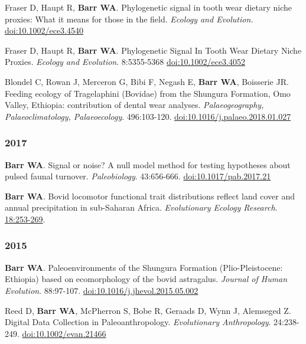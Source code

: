 \item Fraser D, Haupt R,  {\bfseries Barr WA}. Phylogenetic signal in tooth wear dietary niche proxies: What it means for those in the field. \emph{Ecology and Evolution.} \href{https://dx.doi.org/10.1002/ece3.4540}{doi:10.1002/ece3.4540}


\item  Fraser D, Haupt R,  {\bfseries Barr WA}. Phylogenetic Signal In Tooth Wear Dietary Niche Proxies. \emph{Ecology and Evolution}. 8:5355-5368 \href{https://doi.org/10.1002/ece3.4052}{doi:10.1002/ece3.4052}

\item  Blondel C, Rowan J, Merceron G, Bibi F,  Negash E, {\bfseries Barr WA}, Boisserie JR. Feeding ecology of Tragelaphini (Bovidae) from the Shungura Formation, Omo Valley, Ethiopia: contribution of dental wear analyses.  \emph{Palaeogeography, Palaeoclimatology, Palaeoecology}. 496:103-120. \href{https://doi.org/10.1016/j.palaeo.2018.01.027}{doi:10.1016/j.palaeo.2018.01.027}

\subsubsection*{2017}

\item  {\bfseries Barr WA}. Signal or noise? A null model method for testing hypotheses about pulsed faunal turnover. \emph{Paleobiology}. 43:656-666. \href{https://doi.org/10.1017/pab.2017.21}{doi:10.1017/pab.2017.21}

\item  {\bfseries Barr WA}. Bovid locomotor functional trait distributions reflect land cover and annual precipitation in sub-Saharan Africa. \emph{Evolutionary Ecology Research}.  \href{http://www.evolutionary-ecology.com/issues/v18/n03/ddar3051.pdf}{18:253-269}.

\subsubsection*{2015}

\item  {\bfseries Barr WA}. Paleoenvironments of the Shungura Formation (Plio-Pleistocene: Ethiopia) based on ecomorphology of the bovid astragalus. \emph{Journal of Human Evolution}. 88:97-107. \href{http://dx.doi.org/10.1016/j.jhevol.2015.05.002}{doi:10.1016/j.jhevol.2015.05.002}

\item  Reed D, {\bfseries Barr WA}, McPherron S, Bobe R, Geraads D, Wynn J, Alemseged Z. Digital Data Collection in Paleoanthropology. \emph{Evolutionary Anthropology}. 24:238-249. \href{http://dx.doi.org/10.1002/evan.21466}{doi:10.1002/evan.21466}

